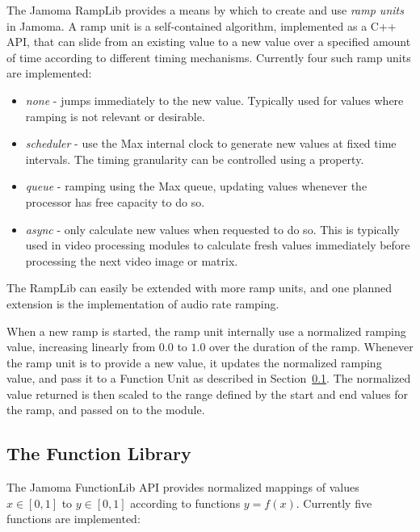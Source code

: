 \documentclass{article}
\begin{document}
The Jamoma RampLib provides a means by which to create and use \emph{ramp units} in Jamoma.  A ramp unit is a self-contained algorithm, implemented as a C++ API, that can slide from an existing value to a new value over a specified amount of time according to different timing mechanisms. Currently four such ramp units are implemented:

\begin{itemize}
	\item \emph{none} - jumps immediately to the new value. Typically used for values where ramping is not relevant or desirable.
	\item \emph{scheduler} - use the Max internal clock to generate new values at fixed time intervals. The timing granularity can be controlled using a property.
	\item \emph{queue} - ramping using the Max queue, updating values whenever the processor has free capacity to do so.
	\item \emph{async} - only calculate new values when requested to do so. This is typically used in video processing modules to calculate fresh values immediately before processing the next video image or matrix.
\end{itemize}

The RampLib can easily be extended with more ramp units, and one planned extension is the implementation of audio rate ramping.

When a new ramp is started, the ramp unit internally use a normalized ramping value, increasing linearly from $0.0$ to $1.0$ over the duration of the ramp. Whenever the ramp unit is to provide a new value, it updates the normalized ramping value, and pass it to a Function Unit as described in Section~\ref{ssec:functionlib}. The normalized value returned is then scaled to the range defined by the start and end values for the ramp, and passed on to the module.



\subsection{The Function Library} %
\label{ssec:functionlib}

The Jamoma FunctionLib API provides normalized mappings of values $x \in [0,1]$ to $y \in [0,1]$ according to functions $y = f(x)$. Currently five functions are implemented: 
\end{document}
